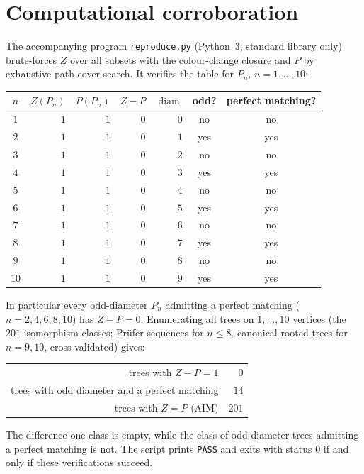 \documentclass[11pt]{article}
\theoremstyle{definition}
\theoremstyle{remark}
\newcommand{\diam}{\operatorname{diam}}
\begin{document}
\section{Computational corroboration}

The accompanying program \texttt{reproduce.py} (Python~3, standard library only)
brute-forces $Z$ over all subsets with the colour-change closure and $P$ by
exhaustive path-cover search. It verifies the table for $P_n$, $n=1,\dots,10$:

\begin{center}
\begin{tabular}{c|r|r|r|r|c|c}
$n$ & $Z(P_n)$ & $P(P_n)$ & $Z-P$ & $\diam$ & odd? & perfect matching? \\
\hline
$1$  & $1$ & $1$ & $0$ & $0$ & no  & no  \\
$2$  & $1$ & $1$ & $0$ & $1$ & yes & yes \\
$3$  & $1$ & $1$ & $0$ & $2$ & no  & no  \\
$4$  & $1$ & $1$ & $0$ & $3$ & yes & yes \\
$5$  & $1$ & $1$ & $0$ & $4$ & no  & no  \\
$6$  & $1$ & $1$ & $0$ & $5$ & yes & yes \\
$7$  & $1$ & $1$ & $0$ & $6$ & no  & no  \\
$8$  & $1$ & $1$ & $0$ & $7$ & yes & yes \\
$9$  & $1$ & $1$ & $0$ & $8$ & no  & no  \\
$10$ & $1$ & $1$ & $0$ & $9$ & yes & yes \\
\end{tabular}
\end{center}

\noindent
In particular every odd-diameter $P_n$ admitting a perfect matching
($n=2,4,6,8,10$) has $Z-P=0$. Enumerating all trees on $1,\dots,10$ vertices
(the $201$ isomorphism classes; Prüfer sequences for $n\le 8$, canonical
rooted trees for $n=9,10$, cross-validated) gives:

\begin{center}
\begin{tabular}{r|r}
trees with $Z-P=1$ & $0$ \\
trees with odd diameter and a perfect matching & $14$ \\
trees with $Z=P$ (AIM) & $201$ \\
\end{tabular}
\end{center}

\noindent
The difference-one class is empty, while the class of odd-diameter trees
admitting a perfect matching is not. The script prints \texttt{PASS} and exits
with status $0$ if and only if these verifications succeed.
\end{document}

